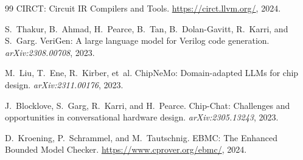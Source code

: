 \documentclass[manuscript]{acmart}
\begin{document}
\begin{thebibliography}{99}
CIRCT: Circuit IR Compilers and Tools.
\url{https://circt.llvm.org/}, 2024.

S.~Thakur, B.~Ahmad, H.~Pearce, B.~Tan, B.~Dolan-Gavitt, R.~Karri, and S.~Garg.
VeriGen: A large language model for Verilog code generation.
\textit{arXiv:2308.00708}, 2023.

M.~Liu, T.~Ene, R.~Kirber, et~al.
ChipNeMo: Domain-adapted LLMs for chip design.
\textit{arXiv:2311.00176}, 2023.

J.~Blocklove, S.~Garg, R.~Karri, and H.~Pearce.
Chip-Chat: Challenges and opportunities in conversational hardware design.
\textit{arXiv:2305.13243}, 2023.

D.~Kroening, P.~Schrammel, and M.~Tautschnig.
EBMC: The Enhanced Bounded Model Checker.
\url{https://www.cprover.org/ebmc/}, 2024.

\end{thebibliography}
\end{document}
